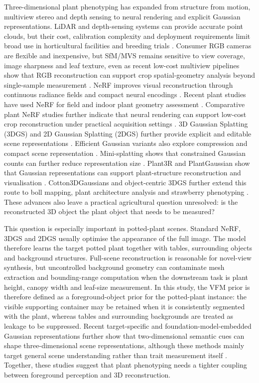 \documentclass[a4paper]{cas-sc}
\begin{document}
Three-dimensional plant phenotyping has expanded from structure from motion, multiview stereo and depth sensing to neural rendering and explicit Gaussian representations. LiDAR and depth-sensing systems can provide accurate point clouds, but their cost, calibration complexity and deployment requirements limit broad use in horticultural facilities and breeding trials \cite{ref14}. Consumer RGB cameras are flexible and inexpensive, but SfM/MVS remains sensitive to view coverage, image sharpness and leaf texture, even as recent low-cost multiview pipelines show that RGB reconstruction can support crop spatial-geometry analysis beyond single-sample measurement \cite{ref18,ref19}. NeRF improves visual reconstruction through continuous radiance fields and compact neural encodings \cite{ref20,ref21,ref22}. Recent plant studies have used NeRF for field and indoor plant geometry assessment \cite{ref25,ref26}. Comparative plant NeRF studies further indicate that neural rendering can support low-cost crop reconstruction under practical acquisition settings \cite{ref59}. 3D Gaussian Splatting (3DGS) and 2D Gaussian Splatting (2DGS) further provide explicit and editable scene representations \cite{ref27,ref28}. Efficient Gaussian variants also explore compression and compact scene representation \cite{ref51,ref52,ref53}. Mini-splatting shows that constrained Gaussian counts can further reduce representation size \cite{ref54}. Plant3R and PlantGaussian show that Gaussian representations can support plant-structure reconstruction and visualisation \cite{ref30,ref31}. Cotton3DGaussians and object-centric 3DGS further extend this route to boll mapping, plant architecture analysis and strawberry phenotyping \cite{ref32,ref33}. These advances also leave a practical agricultural question unresolved: is the reconstructed 3D object the plant object that needs to be measured?

This question is especially important in potted-plant scenes. Standard NeRF, 3DGS and 2DGS usually optimise the appearance of the full image. The model therefore learns the target potted plant together with tables, surrounding objects and background structures. Full-scene reconstruction is reasonable for novel-view synthesis, but uncontrolled background geometry can contaminate mesh extraction and bounding-range computation when the downstream task is plant height, canopy width and leaf-size measurement. In this study, the VFM prior is therefore defined as a foreground-object prior for the potted-plant instance: the visible supporting container may be retained when it is consistently segmented with the plant, whereas tables and surrounding backgrounds are treated as leakage to be suppressed. Recent target-specific and foundation-model-embedded Gaussian representations further show that two-dimensional semantic cues can shape three-dimensional scene representations, although these methods mainly target general scene understanding rather than trait measurement itself \cite{ref68,ref69}. Together, these studies suggest that plant phenotyping needs a tighter coupling between foreground perception and 3D reconstruction.
\end{document}

